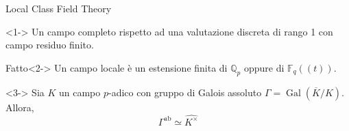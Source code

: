\documentclass[pdf]{beamer}
\def\Q{\mathbb{Q}}
\def\K{K}
\def\Ks{\overline{\K}}
\begin{document}
\begin{frame}{Local Class Field Theory}
	\begin{definition}<1->
		Un campo completo rispetto ad una valutazione discreta di rango 1 con campo residuo finito.
	\end{definition}
	\begin{alertblock}{Fatto}<2->
		Un campo locale è un estensione finita di $\Q_p$ oppure di $\mathbb{F}_q((t))$.
	\end{alertblock}
	\begin{theorem}<3->
		Sia $K$ un campo $p$-adico con gruppo di Galois assoluto $\Gamma=\operatorname{Gal}{(\Ks /K)}$. Allora,
		\[
			\Gamma^\text{ab} \simeq \widehat{K^\times}
		\]
	\end{theorem}
\end{frame}
\end{document}
